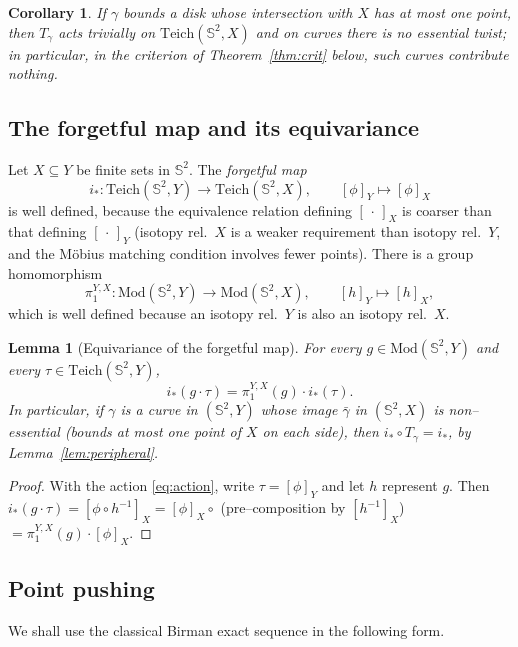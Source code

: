 \documentclass[11pt]{amsart}
\theoremstyle{plain}
\newtheorem{lemma}[theorem]{Lemma}
\newtheorem{corollary}[theorem]{Corollary}
\theoremstyle{definition}
\newcommand{\Sph}{\mathbb{S}^2}
\newcommand{\Teich}{\mathrm{Teich}}
\newcommand{\Mod}{\mathrm{Mod}}
\begin{document}
\begin{corollary}\label{cor:peripheral-action}
If $\gamma$ bounds a disk whose intersection with $X$ has at most one
point, then $T_\gamma$ acts trivially on $\Teich(\Sph,X)$ and on curves
there is no essential twist; in particular, in the criterion of
Theorem~\ref{thm:crit} below, such curves contribute nothing.
\end{corollary}

\subsection{The forgetful map and its equivariance}

Let $X\subseteq Y$ be finite sets in $\Sph$.  The \emph{forgetful map}
$$i_*:\Teich(\Sph,Y)\longrightarrow\Teich(\Sph,X),\qquad
[\phi]_Y\longmapsto[\phi]_X$$
is well defined, because the equivalence relation defining
$[\,\cdot\,]_X$ is coarser than that defining $[\,\cdot\,]_Y$ (isotopy rel.\
$X$ is a weaker requirement than isotopy rel.\ $Y$, and the M\"obius
matching condition involves fewer points).  There is a group homomorphism
\begin{equation}\label{eq:forgethom}
\pi_1^{Y,X}:\Mod(\Sph,Y)\to\Mod(\Sph,X),\qquad
[h]_Y\mapsto [h]_X,
\end{equation}
which is well defined because an isotopy rel.\ $Y$ is also an isotopy rel.\
$X$.

\begin{lemma}[Equivariance of the forgetful map]\label{lem:intertwine1}
For every $g\in\Mod(\Sph,Y)$ and every $\tau\in\Teich(\Sph,Y)$,
$$i_*(g\cdot\tau)=\pi_1^{Y,X}(g)\cdot i_*(\tau).$$
In particular, if $\gamma$ is a curve in $(\Sph,Y)$ whose image
$\bar\gamma$ in $(\Sph,X)$ is non--essential (bounds at most one point of
$X$ on each side), then $i_*\circ T_\gamma=i_*$, by
Lemma~\ref{lem:peripheral}.
\end{lemma}

\begin{proof}
With the action \eqref{eq:action}, write $\tau=[\phi]_Y$ and let $h$
represent $g$.  Then
$i_*(g\cdot\tau)=[\phi\circ h^{-1}]_X
=[\phi]_X\circ$ (pre--composition by $[h^{-1}]_X$)
$=\pi_1^{Y,X}(g)\cdot[\phi]_X$.
\end{proof}

\subsection{Point pushing}

We shall use the classical Birman exact sequence in the following form.
\end{document}
